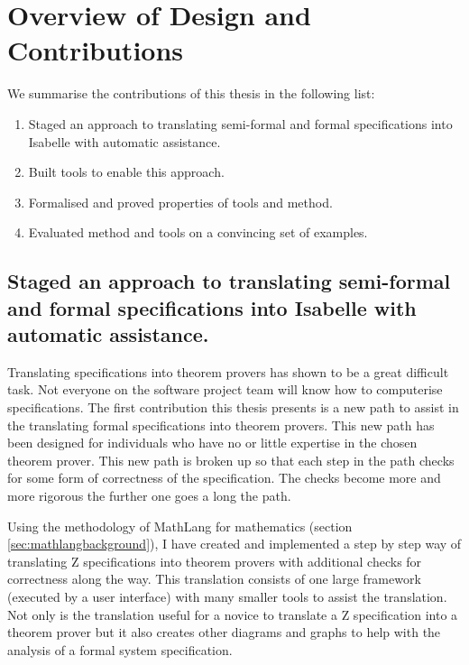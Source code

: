 \chapter{Overview of Design and Contributions}
\label{ch:contributions}

We summarise the contributions of this thesis in the following list:

\begin{enumerate}
\item Staged an approach to translating semi-formal and formal specifications
into Isabelle with automatic assistance.
\item Built tools to enable this approach.
\item Formalised and proved properties of tools and method.
\item Evaluated method and tools on a convincing set of examples.
\end{enumerate}

\section{Staged an approach to translating semi-formal and formal specifications into Isabelle with automatic assistance.}

Translating specifications into theorem provers has shown to be a great
difficult task. Not everyone on the software project team will know how to
computerise specifications. The first contribution this thesis presents is a new
path to assist in the translating formal specifications into theorem provers.
This new path has been designed for individuals who have no or little expertise
in the chosen theorem prover. This new path is broken up so that each step in
the path checks for some form of correctness of the specification. The checks
become more and more rigorous the further one goes a long the path.

Using the methodology of MathLang for mathematics (section
\ref{sec:mathlangbackground}), I have created and implemented a step by step way
of translating Z specifications into theorem provers with additional checks for
correctness along the way. This translation consists of one large framework
(executed by a user interface) with many smaller tools to assist the
translation. Not only is the translation useful for a novice to translate a Z
specification into a theorem prover but it also creates other diagrams and
graphs to help with the analysis of a formal system specification.

